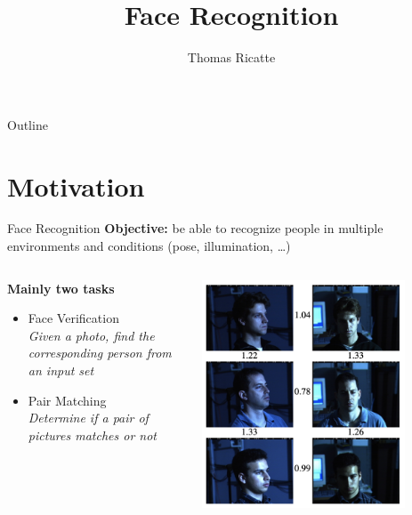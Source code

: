 \documentclass{beamer}
\title{Face Recognition}
\author{Thomas Ricatte}
\begin{document}
\begin{frame} 	 
\titlepage
\end{frame}

\begin{frame}[fragile]{Outline}
  \tableofcontents
\end{frame}

\section{Motivation}

\begin{frame}{Face Recognition}
\textbf{Objective:} be able to recognize people in multiple environments and conditions (pose, illumination, \dots)
\begin{columns}
\begin{column}{0.5\textwidth}
\textbf{Mainly two tasks}
   \begin{itemize}
       \item \textcolor{cBlue}{Face Verification}~\\
       \textit{Given a photo, find the corresponding person from an input set}
       \item \textcolor{cBlue}{Pair Matching}~\\
       \textit{Determine if a pair of pictures matches or not}
   \end{itemize}
\end{column}
\begin{column}{0.5\textwidth}
    \begin{center}
     \includegraphics[width=0.8\textwidth]{images/faces.png}
     \end{center}
\end{column}
\end{columns}
\end{frame}
\end{document}
